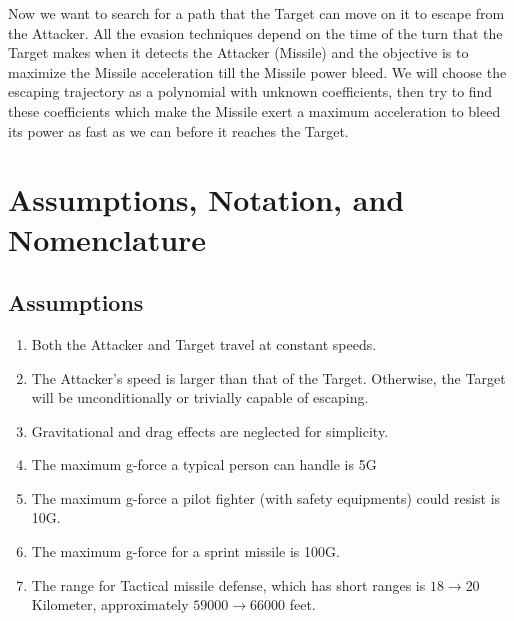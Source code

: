 Now we want to search for a path that the Target can move on it to escape from the Attacker. All the evasion techniques depend on the time of the turn that the Target makes when it detects the Attacker (Missile) and the objective is to maximize the Missile acceleration till the Missile power bleed. 
We will  choose the escaping trajectory as a polynomial with unknown coefficients, then try to find these coefficients which make the Missile exert a maximum acceleration to bleed its power as fast as we can before it reaches the Target.  
\section{Assumptions, Notation, and Nomenclature}
\subsection*{Assumptions}

\begin{enumerate}
	\item Both the Attacker and Target travel at constant speeds.
	\item The Attacker's speed is larger than that of the Target. Otherwise, the Target will be unconditionally or trivially capable of escaping. 
	\item Gravitational and drag effects are neglected for simplicity.
	\item The maximum g-force a typical person can handle is 5G
	\item The maximum g-force a pilot fighter (with safety equipments) could resist is 10G.
	\item The maximum g-force for a sprint missile is 100G.
	\item The range for Tactical missile defense, which has short ranges is $18\to 20$ Kilometer, approximately $59000 \to 66000$ feet. 
	
\end{enumerate}

